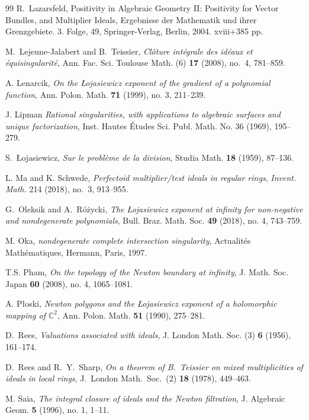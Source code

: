 \documentclass[12pt]{amsart}
\newcommand{\CC}{\mathbb{C}}
\theoremstyle{plain}
\theoremstyle{definition}
\numberwithin{equation}{section}
\begin{document}
\begin{thebibliography}{99}
	R.~Lazarsfeld,
	Positivity in Algebraic Geometry II: Positivity for Vector Bundles, and Multiplier Ideals,
	Ergebnisse der Mathematik und ihrer Grenzgebiete. 3. Folge, 49,
	Springer-Verlag, Berlin, 2004. xviii+385 pp.
	
	M.~Lejeune-Jalabert and B.~Teissier,
	\emph{Cl\^{o}ture int\'egrale des id\'eaux et \'equisingularit\'e},
	Ann. Fac. Sci. Toulouse Math. (6) \textbf{17} (2008), no.~4, 781--859.
	
	A. Lenarcik,
	\emph{On the \L{}ojasiewicz exponent of the gradient of a polynomial function},
	Ann. Polon. Math. \textbf{71} (1999), no. 3, 211--239.
	
	J. Lipman
	\emph{Rational singularities, with applications to algebraic surfaces and unique factorization},
	Inst. Hautes \'Etudes Sci. Publ. Math. No. 36 (1969), 195--279.

	
	S.~\L ojasiewicz,
	\emph{Sur le probl\`eme de la division},
	Studia Math. \textbf{18} (1959), 87--136.
	
	L. Ma and K. Schwede,
	\emph{Perfectoid multiplier/test ideals in regular rings},
	\emph{Invent. Math.} 214 (2018), no.~3, 913--955.
	
	G.~Oleksik and A.~R\'o\.zycki,
	\emph{The \L ojasiewicz exponent at infinity for non-negative and nondegenerate polynomials},
	Bull. Braz. Math. Soc. \textbf{49} (2018), no. 4, 743--759.

    M. Oka,
    \emph{nondegenerate complete intersection singularity},
    Actualit\'es Math\'ematiques, Hermann, Paris, 1997.
	
	T.S. Pham,
	\emph{On the topology of the Newton boundary at infinity},
	J. Math. Soc. Japan \textbf{60} (2008), no. 4, 1065--1081.
	
	A. P\l{}oski,
	\emph{Newton polygons and the \L{}ojasiewicz exponent of a holomorphic mapping of $\CC^2$},
	Ann. Polon. Math. \textbf{51} (1990), 275--281.

	D.~Rees,
	\emph{Valuations associated with ideals},
	J. London Math. Soc. (3) \textbf{6} (1956), 161--174.
	
	D.~Rees and R.~Y.~Sharp,
	\emph{On a theorem of B.~Teissier on mixed multiplicities of ideals in local rings},
	J.\ London Math.\ Soc.\ (2) \textbf{18} (1978), 449--463.
	

	M. Saia,
	\emph{The integral closure of ideals and the Newton filtration},
	J. Algebraic Geom. \textbf{5} (1996), no. 1, 1--11.
	

\end{thebibliography}
\end{document}
